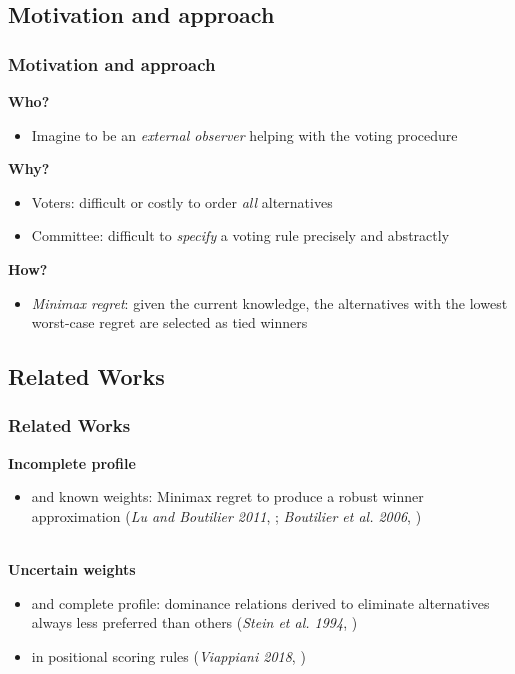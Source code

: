 \documentclass{beamer}
\begin{document}
\subsection{Motivation and approach}
\begin{frame}
	\frametitle{Motivation and approach}
	\textbf{Who?}
	\begin{itemize}
		\item Imagine to be an \emph{external observer} helping with the voting procedure
	\end{itemize}
	\textbf{Why?}
	\begin{itemize}
		\item Voters: difficult or costly to order \emph{all} alternatives
		\item Committee: difficult to \emph{specify} a voting rule precisely and abstractly
	\end{itemize}
	\textbf{How?}
	\begin{itemize}
		\item \emph{Minimax regret}: given the current knowledge, the alternatives with the lowest worst-case regret are selected as tied winners
	\end{itemize}		
\end{frame}

\subsection{Related Works}
\begin{frame}
	\frametitle{Related Works}
	\textbf{Incomplete profile}  
	\begin{itemize}
		\item and known weights: Minimax regret to produce a robust winner approximation (\textit{Lu and Boutilier 2011}, \cite{Lu2011}; \textit{Boutilier et al. 2006}, \cite{Boutilier2006})
	\end{itemize}~\\
	\textbf{Uncertain weights} 
	\begin{itemize}
		\item and complete profile: dominance relations derived to eliminate alternatives always less preferred than others (\textit{Stein et al. 1994}, \cite{Stein1994})
		\item in positional scoring rules (\textit{Viappiani 2018}, \cite{Viappiani2018})
	\end{itemize}
\end{frame}
\end{document}
